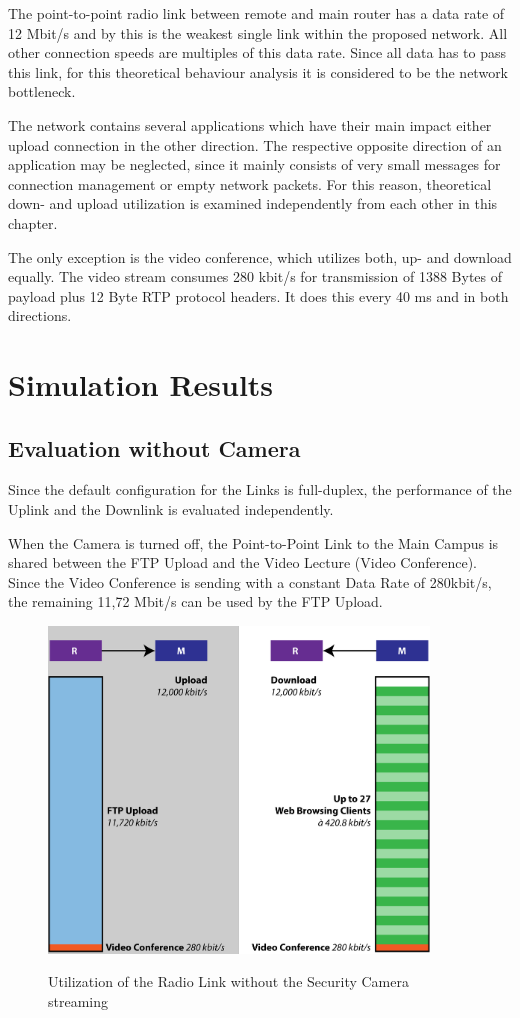 \documentclass[a4paper,10pt]{book}
\begin{document}
The point-to-point radio link between remote and main router has a data rate 
of 12 Mbit/s and by this is the weakest single link within the proposed network. 
All other connection speeds are multiples of this data rate. Since all data has 
to pass this link, for this theoretical behaviour analysis it is considered to 
be the network bottleneck.

The network contains several applications which have their main impact either
upload connection in the other direction. The respective opposite direction of an
 application may be neglected, since it mainly consists of very small messages for connection management or empty network packets. For 
 this reason, theoretical down- and upload utilization is examined independently from each other in this chapter. 

The only exception is the video conference, which utilizes both, up- and download 
equally. The video stream consumes 280 kbit/s for transmission of 1388 Bytes of 
payload plus 12 Byte RTP protocol headers. It does this every 40 ms and in both 
directions.


\chapter{Simulation Results}
\section{Evaluation without Camera}
Since the default configuration for the Links is full-duplex, the performance of the Uplink and the Downlink is evaluated independently.

When the Camera is turned off, the Point-to-Point Link to the Main Campus is shared between the FTP Upload and the Video Lecture (Video Conference).
Since the Video Conference is sending with a constant Data Rate of 280kbit/s, the remaining 
11,72 Mbit/s can be used by the FTP Upload.
\begin{figure}[!ht]
  \centering
    \includegraphics[width=0.9\textwidth]{graphics-02.png}
    \label{fig:g2}
    \caption{Utilization of the Radio Link without the Security Camera streaming}
\end{figure}
\end{document}
